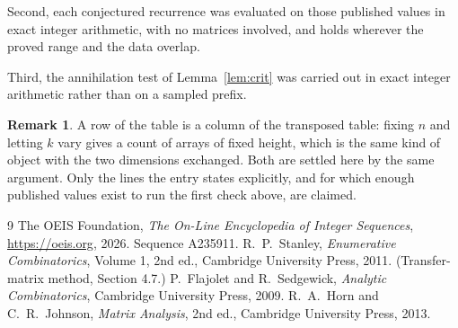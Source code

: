 \documentclass[11pt,a4paper]{article}
\theoremstyle{plain}
\theoremstyle{definition}
\newtheorem{remark}[theorem]{Remark}
\begin{document}
Second, each conjectured recurrence was evaluated on those published values in exact
integer arithmetic, with no matrices involved, and holds wherever the proved range and the
data overlap.

Third, the annihilation test of Lemma~\ref{lem:crit} was carried out in exact integer
arithmetic rather than on a sampled prefix.

\begin{remark}
A row of the table is a column of the transposed table: fixing $n$ and letting $k$ vary gives a
count of arrays of fixed height, which is the same kind of object with the two dimensions
exchanged. Both are settled here by the same argument. Only the lines the entry states
explicitly, and for which enough published values exist to run the first check above, are
claimed.
\end{remark}

\begin{thebibliography}{9}
 The OEIS Foundation, \emph{The On-Line Encyclopedia of Integer
Sequences}, \url{https://oeis.org}, 2026. Sequence A235911.
 R.~P.~Stanley, \emph{Enumerative Combinatorics}, Volume 1, 2nd ed.,
Cambridge University Press, 2011. (Transfer-matrix method, Section 4.7.)
 P.~Flajolet and R.~Sedgewick, \emph{Analytic Combinatorics}, Cambridge
University Press, 2009.
 R.~A.~Horn and C.~R.~Johnson, \emph{Matrix Analysis}, 2nd ed., Cambridge
University Press, 2013.
\end{thebibliography}
\end{document}
